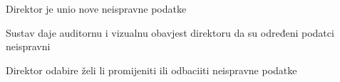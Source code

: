 \begin{packed_item}
\begin{packed_item}
\begin{packed_enum}
							\end{packed_enum}
							
							\item[7.b] Direktor je unio nove neispravne podatke
							\item[] \begin{packed_enum}
								
								\item Sustav daje auditornu i vizualnu obavjest direktoru da su određeni podatci neispravni
								\item Direktor odabire  želi li promijeniti ili odbaciiti neispravne podatke
								
							\end{packed_enum}
							
						\end{packed_item}
					\end{packed_item}
					
